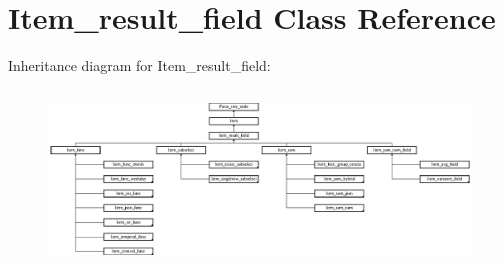 \hypertarget{classItem__result__field}{}\section{Item\+\_\+result\+\_\+field Class Reference}
\label{classItem__result__field}
Inheritance diagram for Item\+\_\+result\+\_\+field\+:\begin{figure}[H]
\begin{center}
\leavevmode
\includegraphics[height=4.723927cm]{classItem__result__field}
\end{center}
\end{figure}

